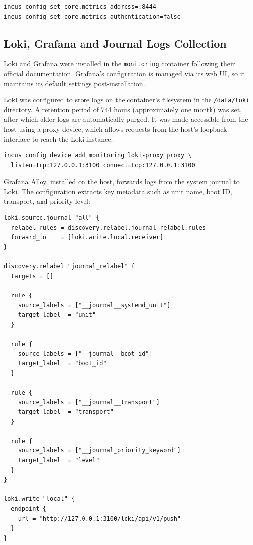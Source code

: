 \begin{lstlisting}[language=bash]
incus config set core.metrics_address=:8444
incus config set core.metrics_authentication=false
\end{lstlisting}

\subsection*{Loki, Grafana and Journal Logs Collection}

Loki and Grafana were installed in the \texttt{monitoring} container following their official documentation\cite{grafana-install-debian}. Grafana's configuration is managed via its web UI, so it maintains its default settings post-installation.

Loki was configured to store logs on the container's filesystem in the \texttt{/data/loki} directory. A retention period of 744 hours (approximately one month) was set, after which older logs are automatically purged. It was made accessible from the host using a proxy device, which allows requests from the host's loopback interface to reach the Loki instance:

\begin{lstlisting}[language=bash]
incus config device add monitoring loki-proxy proxy \
  listen=tcp:127.0.0.1:3100 connect=tcp:127.0.0.1:3100
\end{lstlisting}

Grafana Alloy, installed on the host\cite{grafana-alloy-install}, forwards logs from the system journal to Loki. The configuration\cite{grafana-alloy-config-example} extracts key metadata such as unit name, boot ID, transport, and priority level:

\begin{lstlisting}[caption={Grafana Alloy configuration for forwarding journal logs to Loki.}]
loki.source.journal "all" {
  relabel_rules = discovery.relabel.journal_relabel.rules
  forward_to    = [loki.write.local.receiver]
}

discovery.relabel "journal_relabel" {
  targets = []

  rule {
    source_labels = ["__journal__systemd_unit"]
    target_label  = "unit"
  }

  rule {
    source_labels = ["__journal__boot_id"]
    target_label  = "boot_id"
  }

  rule {
    source_labels = ["__journal__transport"]
    target_label  = "transport"
  }

  rule {
    source_labels = ["__journal_priority_keyword"]
    target_label  = "level"
  }
}

loki.write "local" {
  endpoint {
    url = "http://127.0.0.1:3100/loki/api/v1/push"
  }
}
\end{lstlisting}

